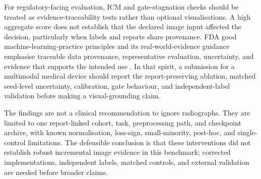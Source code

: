 For regulatory-facing evaluation, ICM and gate-stagnation checks should be
treated as evidence-traceability tests rather than optional visualisations. A
high aggregate score does not establish that the declared image input affected
the decision, particularly when labels and reports share provenance. FDA good
machine-learning-practice principles and its real-world-evidence guidance
emphasise traceable data provenance, representative evaluation, uncertainty, and
evidence that supports the intended use \citep{fda2025gmlp,fda2025rwe}. In that
spirit, a submission for a multimodal medical device should report the
report-preserving ablation, matched seed-level uncertainty, calibration, gate
behaviour, and independent-label validation before making a visual-grounding
claim.

The findings are not a clinical recommendation to ignore radiographs. They are
limited to one report-linked cohort, task, preprocessing path, and checkpoint
archive, with known normalisation, loss-sign, small-minority, post-hoc, and
single-control limitations. The defensible conclusion is that these
interventions did not establish robust incremental image evidence in this
benchmark; corrected implementations, independent labels, matched controls,
and external validation are needed before broader claims.
